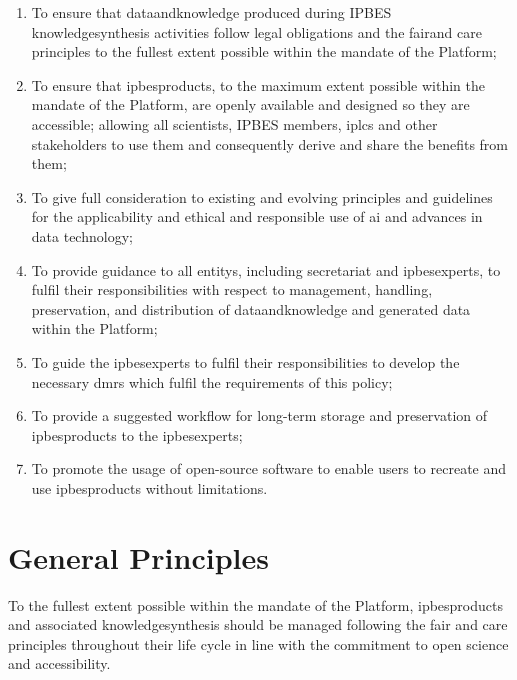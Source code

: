 \documentclass{article}
\begin{document}
\begin{enumerate}[label=(\alph*)]
    \item To ensure that \gls{dataandknowledge} produced during IPBES \gls{knowledgesynthesis} activities follow legal obligations and the \gls{fair}and \gls{care} principles to the fullest extent possible within the mandate of the Platform;
    
    \item To ensure that \glspl{ipbesproduct}, to the maximum extent possible within the mandate of the Platform, are openly available and designed so they are accessible; allowing all scientists, IPBES members, \glspl{iplc} and other \glspl{stakeholder} to use them and consequently derive and share the benefits from them;

    \item To give full consideration to existing and evolving principles and guidelines for the applicability and ethical and responsible use of \gls{ai} and advances in data technology;

    \item To provide guidance to all \glspl{entity}, including \gls{secretariat} and \glspl{ipbesexpert}, to fulfil their responsibilities with respect to management, handling, preservation, and distribution of \gls{dataandknowledge} and generated \gls{data} within the Platform;
    
    \item To guide the \glspl{ipbesexpert} to fulfil their responsibilities to develop the necessary \glspl{dmr} which fulfil the requirements of this policy;
    
    \item To provide a suggested \gls{workflow} for long-term storage and preservation of \glspl{ipbesproduct} to the \glspl{ipbesexpert};
    
    \item To promote the usage of open-source software to enable users to recreate and use \glspl{ipbesproduct} without limitations.
\end{enumerate}


\section{General Principles}

To the fullest extent possible within the mandate of the Platform, \glspl{ipbesproduct} and associated \gls{knowledgesynthesis} should be managed following the \gls{fair} and \gls{care} principles throughout their life cycle in line with the commitment to open science and accessibility.
\end{document}
